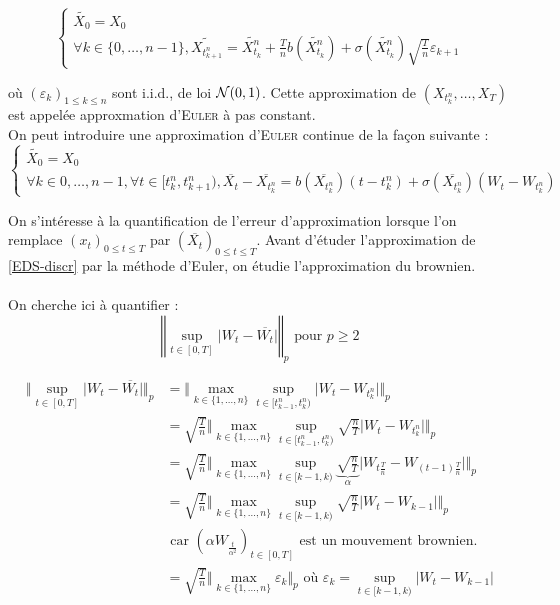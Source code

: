   \[
    \begin{cases}
      \widetilde{X_0} = X_0 \\
      \forall k \in \{0, \ldots, n-1\}, \widetilde{X_{t_{k+1}^n}} = \widetilde{X_{t_k}^n} + \frac{T}{n} b(\widetilde{X_{t_k}^n}) + \sigma(\widetilde{X_{t_k}^n})\sqrt{ \frac{T}{n}} \varepsilon_{k+1}
    \end{cases}
  \]

  où $\left(\varepsilon_k\right)_{1 \leq k \leq n}$ sont i.i.d., de loi $\mathcal{N}(0,1)$.
  Cette approximation de $(X_{t_k^n},\ldots,X_T)$ est appelée approxmation d'\textsc{Euler} à pas constant. \\

  On peut introduire une approximation d'\textsc{Euler} continue de la façon suivante :
  \[
    \begin{cases}
      \widetilde{X_0} = X_0 \\
      \forall k \in {0, \ldots, n-1}, \forall t \in [t_k^n, t_{k+1}^n), \overline{X_t} - \overline{X_{t_k^n}} = b(\overline{X_{t_k^n}}) (t-t_k^n) + \sigma(\overline{X_{t_k^n}})(W_t - W_{t_k^n})
    \end{cases}
  \]

  On s'intéresse à la quantification de l'erreur d'approximation lorsque l'on remplace $(x_t)_{0 \leq t \leq T}$ par $(\overline{X_t})_{0 \leq t \leq T}$. Avant d'étuder l'approximation de \eqref{EDS-discr} par la méthode d'Euler, on étudie l'approximation du brownien. \\

 \\
On cherche ici à quantifier :
\[ \left\Vert \sup_{t \in [0,T]} \vert W_t - \overline{W_t} \vert \right\Vert_p \text{ pour } p \geq 2 \]

\newcommand{\maxn}{\max_{k\in\{1,\ldots,n\} } }
\newcommand{\supt}{\sup_{t \in [t_{k-1}^n, t_k^n)} }
\renewcommand{\wtk}{W_{t_k^n}}
\begin{equation*}
\begin{split}
  \Vert \sup_{t \in [0,T]} \vert W_t - \overline{W_t} \vert \Vert_p &= \Vert \maxn \supt \vert W_t - \wtk \vert \Vert_p  \\
  &= \sqrt{\frac{T}{n}} \Vert \maxn \supt \sqrt{\frac{n}{T}} \vert W_t - \wtk \vert \Vert_p  \\
  &= \sqrt{\frac{T}{n}} \Vert \maxn \sup_{t \in [k-1, k)} \underbrace{\sqrt{\frac{n}{T}}}_\alpha \vert W_{t {\frac{T}{n}}} - W_{(t-1) \frac{T}{n}} \vert \Vert_p \\
  &= \sqrt{\frac{T}{n}} \Vert \maxn \sup_{t \in [k-1, k)} \sqrt{\frac{n}{T}} \vert W_t - W_{k-1} \vert \Vert_p \\
  &\text{ car $(\alpha W_{ \frac{t}{\alpha^2}})_{t \in [0,T]}$ est un mouvement brownien. } \\
  &= \sqrt{ \frac{T}{n} } \Vert \max_{k \in \{ 1, \ldots, n \}} \varepsilon_k \Vert_p \text{ où } \varepsilon_k = \sup_{t \in [k-1, k)} \vert W_t - W_{k-1} \vert
\end{split}
\end{equation*}

